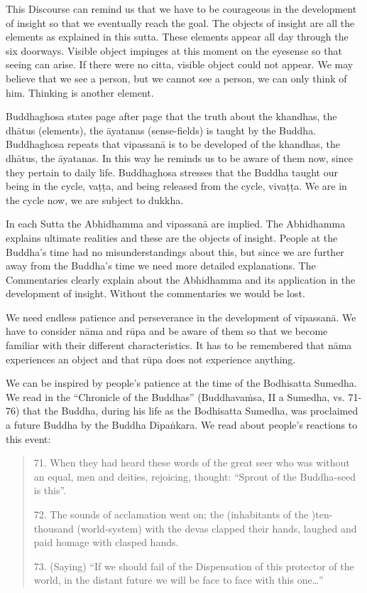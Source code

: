 This Discourse can remind us that we have to be courageous in the development of insight so that we eventually reach the goal. The objects of insight are all the elements as explained in this sutta. These elements appear all day through the six doorways. Visible object impinges at this moment on the eyesense so that seeing can arise. If there were no citta, visible object could not appear. We may believe that we see a person, but we cannot see a person, we can only think of him. Thinking is another element.

Buddhaghosa states page after page that the truth about the khandhas, the dhātus (elements), the āyatanas (sense-fields) is taught by the Buddha. Buddhaghosa repeats that vipassanā is to be developed of the khandhas, the dhātus, the āyatanas. In this way he reminds us to be aware of them now, since they pertain to daily life. Buddhaghosa stresses that the Buddha taught our being in the cycle, vaṭṭa, and being released from the cycle, vivaṭṭa. We are in the cycle now, we are subject to dukkha.

In each Sutta the Abhidhamma and vipassanā are implied. The Abhidhamma explains ultimate realities and these are the objects of insight. People at the Buddha's time had no misunderstandings about this, but since we are further away from the Buddha's time we need more detailed explanations. The Commentaries clearly explain about the Abhidhamma and its application in the development of insight. Without the commentaries we would be lost.

We need endless patience and perseverance in the development of vipassanā. We have to consider nāma and rūpa and be aware of them so that we become familiar with their different characteristics. It has to be remembered that nāma experiences an object and that rūpa does not experience anything.

We can be inspired by people’s patience at the time of the Bodhisatta Sumedha. We read in the ``Chronicle of the Buddhas'' (Buddhavaṁsa, II a Sumedha, vs. 71-76) that the Buddha, during his life as the Bodhisatta Sumedha, was proclaimed a future Buddha by the Buddha Dīpaṅkara. We read about people’s reactions to this event:

\begin{quote}
71. When they had heard these words of the great seer who was without an equal, men and deities, rejoicing, thought: ``Sprout of the Buddha-seed is this''.

72. The sounds of acclamation went on; the (inhabitants of the )ten-thousand (world-system) with the devas clapped their hands, laughed and paid homage with clasped hands.

73. (Saying) ``If we should fail of the Dispensation of this protector of the world, in the distant future we will be face to face with this one\ldots ''

\end{quote}

